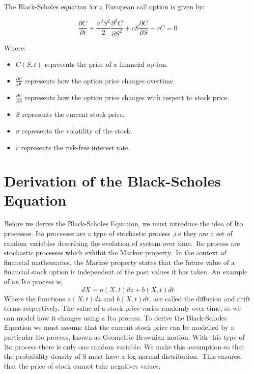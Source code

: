 \documentclass[11pt]{article}
\begin{document}
The Black-Scholes equation for a European call option is given by:

\[ \frac{\partial C}{\partial t} + \frac{\sigma^2S^2}{2} \frac{\partial^2 C}{\partial S^2} + rS \frac{\partial C}{\partial S} - rC = 0 \]

Where:
\begin{itemize}
    \item \(C(S, t)\) represents the price of a financial option.
    \item \(\frac{\partial C}{\partial t}\) represents how the option price changes overtime.
    \item \(\frac{\partial C}{\partial S}\) represents how the option price changes with respect to stock price.
    \item \(S\) represents the current stock price.
    \item \(\sigma\) represents the volatility of the stock.
    \item \(r\) represents the risk-free interest rate.
\end{itemize}

\newpage


\section{Derivation of the Black-Scholes Equation}

Before we derive the Black-Scholes Equation, we must introduce the idea of Ito processes.
Ito processes are a type of stochastic process ,i.e they are a set of random variables describing the evolution of system over time.\ Ito process are stochastic processes which exhibit the Markov property.\ In the context of financial mathematics, the Markov property states that the future value of a financial stock option is independent of the past values it has taken. An example of an Ito process is,
\begin{equation*}
dX = a(X,t)dz + b(X,t)dt 
\end{equation*}
Where the functions $a(X,t)dz$ and $b(X,t)dt$, are called the diffusion and drift terms respectively. The value of a stock price varies randomly over time, so we can model how it changes using a Ito process. To derive the Black-Scholes Equation we must assume that the current stock price can be modelled by a particular Ito process, known as Geometric Brownian motion. With this type of Ito process there is only one random variable. We make this assumption so that the probability density of S must have a log-normal distribution.\ This ensures, that the price of stock cannot take negatives values.
\end{document}
